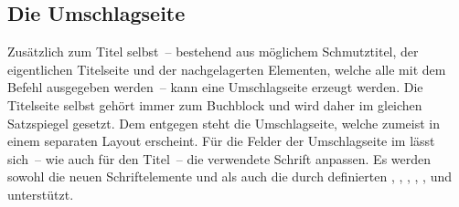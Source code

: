\subsection{Die Umschlagseite}
\label{sec:cover}%
%
%
%
Zusätzlich zum Titel selbst~-- bestehend aus möglichem Schmutztitel, der 
eigentlichen Titelseite und der nachgelagerten Elementen, welche alle mit dem 
Befehl  ausgegeben werden~-- kann eine Umschlagseite erzeugt 
werden. Die Titelseite selbst gehört immer zum Buchblock und wird daher im 
gleichen Satzspiegel gesetzt. Dem entgegen steht die Umschlagseite, welche 
zumeist in einem separaten Layout erscheint. 
Für die Felder der Umschlagseite im \CD lässt sich~-- wie auch für den Titel~-- 
die verwendete Schrift anpassen. Es werden sowohl die neuen Schriftelemente 
 und  als auch die durch \KOMAScript{} definierten 
, , , , , 
und  unterstützt.

